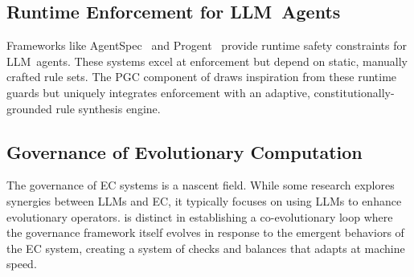 \subsection{Runtime Enforcement for LLM~Agents}
Frameworks like AgentSpec~\cite{agentspec2023} and Progent~\cite{progent2023} provide runtime safety constraints for LLM~agents. These systems excel at enforcement but depend on static, manually crafted rule sets. The PGC component of \acgs{} draws inspiration from these runtime guards but uniquely integrates enforcement with an adaptive, constitutionally-grounded rule synthesis engine.

\subsection{Governance of Evolutionary Computation}
The governance of EC systems is a nascent field. While some research explores synergies between LLMs and EC, it typically focuses on using LLMs to enhance evolutionary operators. \acgs{} is distinct in establishing a co-evolutionary loop where the governance framework itself evolves in response to the emergent behaviors of the EC system, creating a system of checks and balances that adapts at machine speed.
